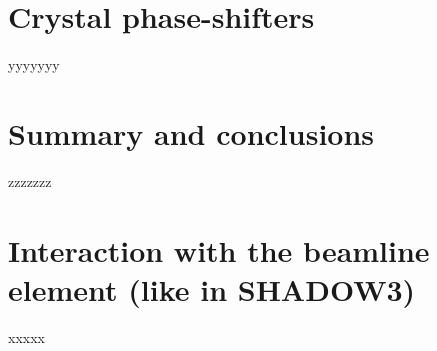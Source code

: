 \documentclass{iucr}
\begin{document}
\section{Crystal phase-shifters}\label{sec:phasesifters}

yyyyyyy


\section{Summary and conclusions}
\label{sec:summary}

zzzzzzz



\appendix

\section{Interaction with the beamline element (like in SHADOW3)}
\label{sec:S3}

xxxxx

\end{document}
